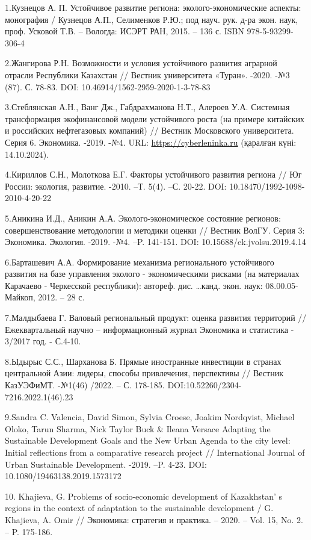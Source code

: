 \begin{references}
1.Кузнецов А. П. Устойчивое развитие региона: эколого-экономические
аспекты:
монография / Кузнецов А.П., Селименков Р.Ю.; под науч. рук. д-ра экон.
наук, проф. Усковой Т.В. -- Вологда: ИСЭРТ РАН, 2015. -- 136 с. ISBN
978-5-93299-306-4

2.Жангирова Р.Н. Возможности и условия устойчивого развития аграрной
отрасли
Республики Казахстан // Вестник университета «Туран». -2020. -№3 (87).
С. 78-83. DOI: 10.46914/1562-2959-2020-1-3-78-83

3.Стеблянская А.Н., Ванг Дж., Габдрахманова Н.Т., Алероев У.А. Системная
трансформация экофинансовой модели устойчивого роста (на примере
китайских и российских нефтегазовых компаний) // Вестник Московского
университета. Серия 6. Экономика. -2019. -№4. URL:
\href{https://cyberleninka.ru/article/n/sistemnaya-transformatsiya-ekofinansovoy-modeli-ustoychivogo-rosta-na-primere-kitayskih-i-rossiyskih-neftegazovyh-kompaniy}{https://cyberleninka.ru}
(қаралған күні: 14.10.2024).

4.Кириллов С.Н., Молоткова Е.Г. Факторы устойчивого развития региона //
Юг России:
экология, развитие. -2010. --Т. 5(4). --С. 20-22. DOI:
10.18470/1992-1098-2010-4-20-22

5.Аникина И.Д., Аникин А.А. Эколого-экономическое состояние регионов:
совершенствование методологии и методики оценки // Вестник ВолГУ. Серия
3: Экономика. Экология. -2019. -№4. --P. 141-151. DOI:
10.15688/ek.jvolsu.2019.4.14

6.Барташевич А.А. Формирование механизма регионального устойчивого
развития на базе
управления эколого - экономическими рисками (на материалах Карачаево -
Черкесской республики): автореф. дис. \ldots канд. экон. наук: 08.00.05-
Майкоп, 2012. -- 28 с.

7.Малдыбаева Г. Валовый региональный продукт: оценка развития территорий
//Ежеквартальный научно -- информационный журнал Экономика и статистика
- 3/2017 год. - С.4-10.

8.Ыдырыс С.С., Шарханова Б. Прямые иностранные инвестиции в странах
центральной
Азии: лидеры, способы привлечения, перспективы // Вестник КазУЭФиМТ.
-№1(46) /2022. -- С. 178-185. DOI:10.52260/2304-7216.2022.1(46).23

9.Sandra C. Valencia, David Simon, Sylvia Croese, Joakim Nordqvist,
Michael Oloko, Tarun
Sharma, Nick Taylor Buck \& Ileana Versace Adapting the Sustainable
Development Goals and the New Urban Agenda to the city level: Initial
reflections from a comparative research project // International Journal
of Urban Sustainable Development. -2019. --P. 4-23. DOI:
10.1080/19463138.2019.1573172

10. Khajieva, G. Problems of socio-economic development of
Kazakhstan' s regions in the
context of adaptation to the sustainable development / G. Khajieva, A.
Omir // Экономика: стратегия и практика. -- 2020. -- Vol. 15, No. 2. --
P. 175-186.
\end{references}

